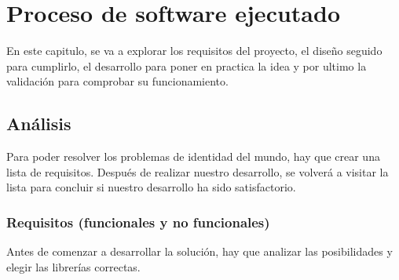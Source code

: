\chapter{Proceso de software ejecutado}\label{Proceso de software ejecutado}

\thispagestyle{fancy}


En este capitulo, se va a explorar los requisitos del proyecto, el diseño seguido para cumplirlo, el desarrollo para poner en practica la idea y por ultimo la validación para comprobar su funcionamiento.

\section{Análisis}
Para poder resolver los problemas de identidad del mundo, hay que crear una lista de requisitos. Después de realizar nuestro desarrollo, se volverá a visitar la lista para concluir si nuestro desarrollo ha sido satisfactorio.

\subsection{Requisitos (funcionales y no funcionales)}
Antes de comenzar a desarrollar la solución, hay que analizar las posibilidades y elegir las librerías correctas.


